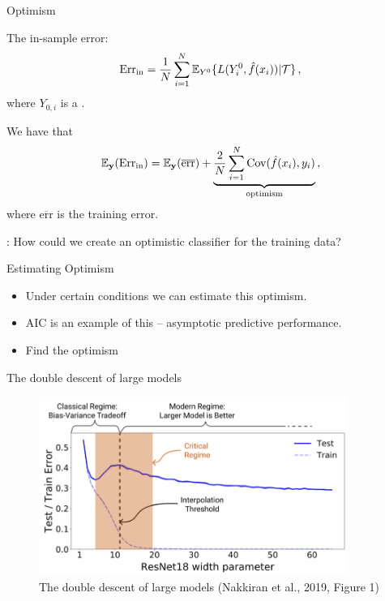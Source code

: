 \documentclass[10pt,handout]{beamer}
\begin{document}

\begin{frame}{Optimism}

The in-sample  error:
\[
\text{Err}_\text{in} = \frac{1}{N}\sum^N_{i=1} \operatorname{\mathbb{E}}_{Y^0}\{L(Y^0_i,\hat{f}(x_i))|\mathcal{T}\}\,,
\]
where $Y_{0,i}$ is a .\\[3mm]

\pause

We have that
\[
\operatorname{\mathbb{E}}_\mathbf{y} (\text{Err}_\text{in}) = \operatorname{\mathbb{E}}_\mathbf{y}(\overline{\text{err}}) + \underbrace{\frac{2}{N}\sum^N_{i=1} \text{Cov}(\hat{f}(x_i),y_i)}_{\text{optimism}}\,,
\]
where $\overline{\text{err}}$ is the training error.

: How could we create an optimistic classifier for the training data?

\end{frame}

\begin{frame}{Estimating Optimism}

\begin{itemize}
\item Under certain conditions we can estimate this optimism.
\item AIC is an example of this -- asymptotic predictive performance.
\item Find the optimism
\end{itemize}


\end{frame}



\begin{frame}{The double descent of large models}

\begin{figure}[h]
\caption{The double descent of large models (Nakkiran et al., 2019, Figure 1)}
\centering
\includegraphics[width=0.9\textwidth]{figs/Nakkiran_et_al_2019.png}
\end{figure}



\end{frame}
\end{document}
